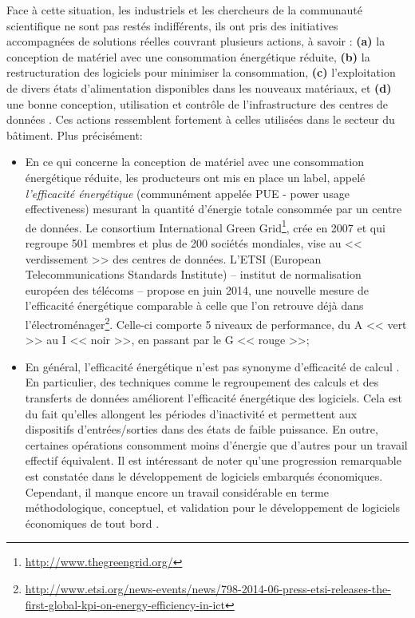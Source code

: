 Face à cette situation, les industriels et les chercheurs de la communauté scientifique ne sont pas restés indifférents, ils ont pris des initiatives accompagnées de solutions réelles couvrant plusieurs actions, à savoir : \textbf{(a)} la conception de matériel avec une consommation énergétique réduite, \textbf{(b)} la restructuration des logiciels pour minimiser la consommation, \textbf{(c)} l'exploitation de divers états d'alimentation disponibles dans les nouveaux matériaux, et \textbf{(d)} une bonne conception, utilisation et contrôle de l'infrastructure des centres de données \cite{Kant09}. Ces actions ressemblent fortement à celles utilisées dans le secteur du bâtiment. Plus précisément: 
\begin{itemize}
	\item En ce qui concerne la conception de matériel avec une consommation énergétique réduite, les producteurs ont mis en place un label, appelé \textit{l'efficacité énergétique} (communément appelée PUE - power usage effectiveness) mesurant la quantité d'énergie totale consommée par un centre de données. Le consortium International Green Grid\footnote{\url{http://www.thegreengrid.org/}}, crée en 2007 et qui regroupe 501 membres et plus de 200 sociétés mondiales, vise au << verdissement >> des centres de données. L'ETSI (European Telecommunications Standards Institute) -- institut de normalisation européen des télécoms -- propose en juin 2014, une nouvelle mesure de l'efficacité énergétique comparable à celle que l'on retrouve déjà dans l'électroménager\footnote{\url{http://www.etsi.org/news-events/news/798-2014-06-press-etsi-releases-the-first-global-kpi-on-energy-efficiency-in-ict}}. Celle-ci comporte 5 niveaux de performance, du A << vert >> au I << noir >>, en passant par le G << rouge >>;
	\item En général, l'efficacité énergétique n'est pas synonyme d'efficacité de calcul \cite{Kant09}. En particulier, des techniques comme le regroupement des calculs et des transferts de données améliorent l'efficacité énergétique des logiciels. Cela est du fait qu'elles allongent les périodes d'inactivité et permettent aux dispositifs d'entrées/sorties dans des états de faible puissance. En outre, certaines opérations consomment moins d'énergie que d'autres pour un travail effectif équivalent. Il est intéressant de noter qu'une progression remarquable est constatée dans le développement de logiciels embarqués économiques. Cependant, il manque encore un travail considérable en terme  méthodologique, conceptuel, et validation pour le développement de logiciels économiques de tout bord \cite{Kant09}.

\end{itemize}
